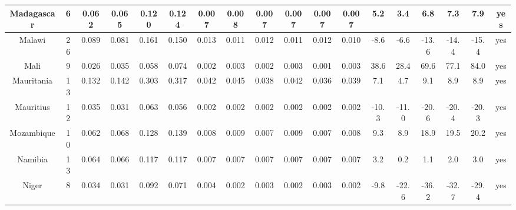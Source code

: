 \documentclass[10pt]{article}
\begin{document}
\begin{center}
\begin{tabular}{|c|c|c|c|c|c|c|c|c|c|c|c|c|c|c|c|c|c|}
\hline
Madagascar & 6 & 0.062 & 0.065 & 0.120 & 0.124 & 0.007 & 0.008 & 0.007 & 0.007 & 0.007 & 0.007 & 5.2 & 3.4 & 6.8 & 7.3 & 7.9 & yes \\
\hline
Malawi & 26 & 0.089 & 0.081 & 0.161 & 0.150 & 0.013 & 0.011 & 0.012 & 0.011 & 0.012 & 0.010 & -8.6 & -6.6 & -13.6 & -14.4 & -15.4 & yes \\
\hline
Mali & 9 & 0.026 & 0.035 & 0.058 & 0.074 & 0.002 & 0.003 & 0.002 & 0.003 & 0.001 & 0.003 & 38.6 & 28.4 & 69.6 & 77.1 & 84.0 & yes \\
\hline
Mauritania & 13 & 0.132 & 0.142 & 0.303 & 0.317 & 0.042 & 0.045 & 0.038 & 0.042 & 0.036 & 0.039 & 7.1 & 4.7 & 9.1 & 8.9 & 8.9 & yes \\
\hline
Mauritius & 12 & 0.035 & 0.031 & 0.063 & 0.056 & 0.002 & 0.002 & 0.002 & 0.002 & 0.002 & 0.002 & -10.3 & -11.0 & -20.6 & -20.4 & -20.3 & yes \\
\hline
Mozambique & 10 & 0.062 & 0.068 & 0.128 & 0.139 & 0.008 & 0.009 & 0.007 & 0.009 & 0.007 & 0.008 & 9.3 & 8.9 & 18.9 & 19.5 & 20.2 & yes \\
\hline
Namibia & 13 & 0.064 & 0.066 & 0.117 & 0.117 & 0.007 & 0.007 & 0.007 & 0.007 & 0.007 & 0.007 & 3.2 & 0.2 & 1.1 & 2.0 & 3.0 & yes \\
\hline
Niger & 8 & 0.034 & 0.031 & 0.092 & 0.071 & 0.004 & 0.002 & 0.003 & 0.002 & 0.003 & 0.002 & -9.8 & -22.6 & -36.2 & -32.7 & -29.4 & yes \\
\hline
\end{tabular}
\end{center}
\end{document}

